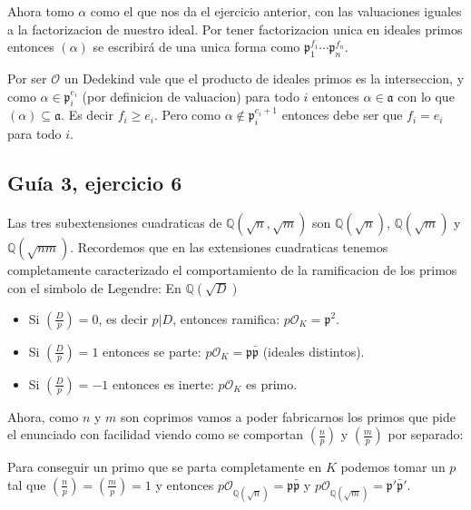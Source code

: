 \documentclass[12pt]{amsart}
\newcommand{\QQ}{\mathbb{Q}}
\newcommand{\pp}{\mathfrak{p}}
\newcommand{\aaa}{\mathfrak{a}}
\newcommand{\OO}{\mathcal{O}}
\newcommand{\leg}[2]{\left( \frac{#1}{#2} \right)}
\theoremstyle{plain}
\begin{document}
Ahora tomo $\alpha$ como el que nos da el ejercicio anterior, con las 
valuaciones iguales a la factorizacion de nuestro ideal. Por tener 
factorizacion unica en ideales primos entonces $(\alpha)$ se escribirá
de una unica forma como $\pp_1^{f_1}\cdots\pp_n^{f_n}$.

Por ser $\OO$ un Dedekind vale que el producto de ideales primos es la 
interseccion, y como $\alpha \in \pp_i^{e_i}$ (por definicion de valuacion)
para todo $i$ entonces $\alpha \in \aaa$ con lo que $(\alpha)\subseteq\aaa$.
Es decir $f_i\geq e_i$. Pero como $\alpha \notin \pp_i^{e_i+1}$ entonces 
debe ser que $f_i=e_i$ para todo $i$.


\subsection*{Guía 3, ejercicio 6}

Las tres subextensiones cuadraticas de $\QQ(\sqrt{n},\sqrt{m})$ son $\QQ(\sqrt{n})$, $\QQ(\sqrt{m})$ y $\QQ(\sqrt{nm})$. Recordemos que en las extensiones cuadraticas tenemos completamente caracterizado el comportamiento de la ramificacion de los primos con el simbolo de Legendre: En $\QQ(\sqrt{D})$
\begin{itemize}
    \item Si $\leg{D}{p}=0$, es decir $p|D$, entonces ramifica: $p\OO_K = \pp^2$.
    \item Si $\leg{D}{p}=1$ entonces se parte: $p\OO_K = \pp\bar{\pp}$ (ideales distintos).
    \item Si $\leg{D}{p}=-1$ entonces es inerte: $p\OO_K$ es primo.
\end{itemize}

Ahora, como $n$ y $m$ son coprimos vamos a poder fabricarnos los primos que pide el enunciado con facilidad viendo como se comportan $\leg{n}{p}$ y $\leg{m}{p}$ por separado:

Para conseguir un primo que se parta completamente en $K$ podemos tomar un $p$ tal que $\leg{n}{p} = \leg{m}{p} = 1$ y entonces $p\OO_{\QQ(\sqrt{n})} = \pp \bar{\pp}$ y $p\OO_{\QQ(\sqrt{m})} =\pp' \bar{\pp}'$.






\end{document}
